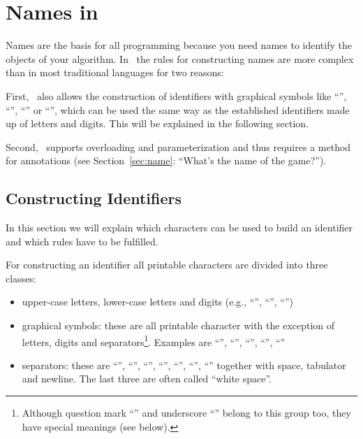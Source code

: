 \chapter{Names in \opal}
\label{chap:names}
\novice
 Names are the basis for all programming because you need names to identify
the objects of your algorithm.
In \opal\ the rules for constructing names are more complex than in
most traditional languages for two reasons:

First, \opal\ also allows the construction of  identifiers with graphical
symbols like ``\pro{+}'', ``\pro{-}'', ``\pro{\%}'' or ``\pro{\#}'',
which can be used the same way as the established identifiers
made up of  letters and digits. 
This will be explained in the following section.

Second, \opal\ supports overloading and parameterization and thus requires
a method for annotations (see Section~\ref{sec:name}: ``What's the
name of the game?''). 


\section{Constructing Identifiers}
\label{sec:ide}
\novice
In this section we will explain which characters can be used to
build an identifier and which rules have to be fulfilled.

For constructing an identifier all  printable characters are divided
into three classes:
\begin{itemize}
\item upper-case letters,  lower-case letters and  digits
  (e.g., ``'', ``'', ``'')
\item  graphical symbols: these are all printable character with the
   exception of  letters, digits and separators\footnote{%
Although   question mark ``'' and  underscore
  ``\pro{\_}'' belong to this group too, they have special meanings
  (see below).}. 
Examples are ``\pro{+}'', ``\pro{\$}'', ``'', ``\pro{\{}'',
``\pro{!}'' 
\item  separators: these are ``\pro{(}'', ``\pro{)}'', ``\pro{,}'',
  ``'', ``'', ``\pro{[}'', ``\pro{]}'' together with
   space,  tabulator and newline. 
   The last three are often called ``white space''.

\end{itemize}

